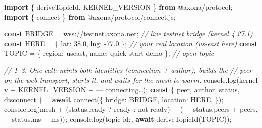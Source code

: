 \documentclass[
  nobib]{tufte-handout}
\newenvironment{Shaded}{}{}
\newcommand{\AttributeTok}[1]{\textcolor[rgb]{0.49,0.56,0.16}{#1}}
\newcommand{\BuiltInTok}[1]{\textcolor[rgb]{0.00,0.50,0.00}{#1}}
\newcommand{\CommentTok}[1]{\textcolor[rgb]{0.38,0.63,0.69}{\textit{#1}}}
\newcommand{\ControlFlowTok}[1]{\textcolor[rgb]{0.00,0.44,0.13}{\textbf{#1}}}
\newcommand{\DataTypeTok}[1]{\textcolor[rgb]{0.56,0.13,0.00}{#1}}
\newcommand{\FloatTok}[1]{\textcolor[rgb]{0.25,0.63,0.44}{#1}}
\newcommand{\FunctionTok}[1]{\textcolor[rgb]{0.02,0.16,0.49}{#1}}
\newcommand{\ImportTok}[1]{\textcolor[rgb]{0.00,0.50,0.00}{\textbf{#1}}}
\newcommand{\KeywordTok}[1]{\textcolor[rgb]{0.00,0.44,0.13}{\textbf{#1}}}
\newcommand{\NormalTok}[1]{#1}
\newcommand{\OperatorTok}[1]{\textcolor[rgb]{0.40,0.40,0.40}{#1}}
\newcommand{\StringTok}[1]{\textcolor[rgb]{0.25,0.44,0.63}{#1}}
\begin{document}
\begin{Shaded}
\begin{Highlighting}[]
\ImportTok{import}\NormalTok{ \{ deriveTopicId}\OperatorTok{,}\NormalTok{ KERNEL\_VERSION \} }\ImportTok{from} \StringTok{\textquotesingle{}@axona/protocol\textquotesingle{}}\OperatorTok{;}
\ImportTok{import}\NormalTok{ \{ connect \} }\ImportTok{from} \StringTok{\textquotesingle{}@axona/protocol/connect.js\textquotesingle{}}\OperatorTok{;}

\KeywordTok{const}\NormalTok{ BRIDGE }\OperatorTok{=} \StringTok{\textquotesingle{}wss://testnet.axona.net\textquotesingle{}}\OperatorTok{;}           \CommentTok{// live testnet bridge (kernel 4.27.1)}
\KeywordTok{const}\NormalTok{ HERE   }\OperatorTok{=}\NormalTok{ \{ }\DataTypeTok{lat}\OperatorTok{:} \FloatTok{38.0}\OperatorTok{,} \DataTypeTok{lng}\OperatorTok{:} \OperatorTok{{-}}\FloatTok{77.0}\NormalTok{ \}}\OperatorTok{;}           \CommentTok{// your real location (us{-}east here)}
\KeywordTok{const}\NormalTok{ TOPIC  }\OperatorTok{=}\NormalTok{ \{ }\DataTypeTok{region}\OperatorTok{:} \StringTok{\textquotesingle{}useast\textquotesingle{}}\OperatorTok{,} \DataTypeTok{name}\OperatorTok{:} \StringTok{\textquotesingle{}quick{-}start{-}demo\textquotesingle{}}\NormalTok{ \}}\OperatorTok{;}   \CommentTok{// open topic}

\CommentTok{// 1–3. One call: mints both identities (connection + author), builds the}
\CommentTok{//      peer on the web transport, starts it, and waits for the mesh to warm.}
\BuiltInTok{console}\OperatorTok{.}\FunctionTok{log}\NormalTok{(}\StringTok{\textquotesingle{}kernel v\textquotesingle{}} \OperatorTok{+}\NormalTok{ KERNEL\_VERSION }\OperatorTok{+} \StringTok{\textquotesingle{} — connecting…\textquotesingle{}}\NormalTok{)}\OperatorTok{;}
\KeywordTok{const}\NormalTok{ \{ peer}\OperatorTok{,}\NormalTok{ author}\OperatorTok{,}\NormalTok{ status}\OperatorTok{,}\NormalTok{ disconnect \} }\OperatorTok{=} \ControlFlowTok{await} \FunctionTok{connect}\NormalTok{(\{}
  \DataTypeTok{bridge}\OperatorTok{:}\NormalTok{   BRIDGE}\OperatorTok{,}
  \DataTypeTok{location}\OperatorTok{:}\NormalTok{ HERE}\OperatorTok{,}
\NormalTok{\})}\OperatorTok{;}
\BuiltInTok{console}\OperatorTok{.}\FunctionTok{log}\NormalTok{(}\StringTok{\textquotesingle{}mesh \textquotesingle{}} \OperatorTok{+}\NormalTok{ (status}\OperatorTok{.}\AttributeTok{ready} \OperatorTok{?} \StringTok{\textquotesingle{}ready\textquotesingle{}} \OperatorTok{:} \StringTok{\textquotesingle{}not ready\textquotesingle{}}\NormalTok{) }\OperatorTok{+} \StringTok{\textquotesingle{} (\textquotesingle{}} \OperatorTok{+}\NormalTok{ status}\OperatorTok{.}\AttributeTok{peers} \OperatorTok{+} \StringTok{\textquotesingle{} peers, \textquotesingle{}} \OperatorTok{+}\NormalTok{ status}\OperatorTok{.}\AttributeTok{ms} \OperatorTok{+} \StringTok{\textquotesingle{}ms)\textquotesingle{}}\NormalTok{)}\OperatorTok{;}
\BuiltInTok{console}\OperatorTok{.}\FunctionTok{log}\NormalTok{(}\StringTok{\textquotesingle{}topic id:\textquotesingle{}}\OperatorTok{,} \ControlFlowTok{await} \FunctionTok{deriveTopicId}\NormalTok{(TOPIC))}\OperatorTok{;}


\end{Highlighting}
\end{Shaded}
\end{document}
